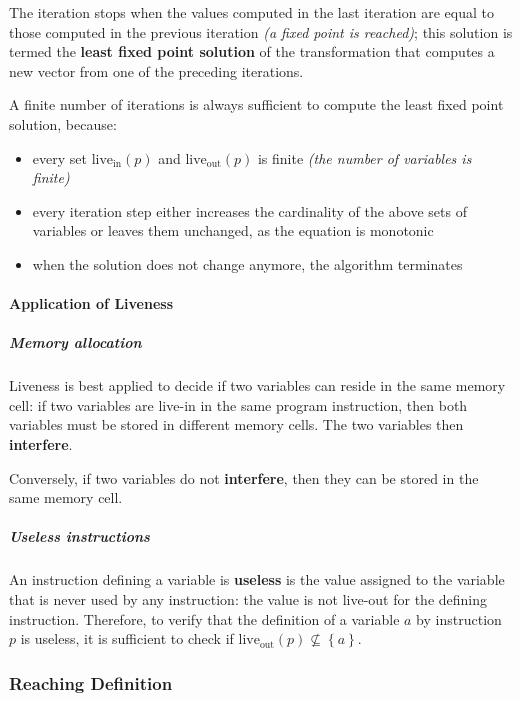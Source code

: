 \documentclass[english]{article}
\begin{document}
The iteration stops when the values computed in the last iteration are equal to those computed in the previous iteration \textit{(a fixed point is reached)};
this solution is termed the \textbf{least fixed point solution} of the transformation that computes a new vector from one of the preceding iterations.

A finite number of iterations is always sufficient to compute the least fixed point solution, because:

\begin{itemize}
  \item every set \(\text{live}_\text{in}\left( p \right)\) and \(\text{live}_\text{out}\left( p \right)\) is finite \textit{(the number of variables is finite)}
  \item every iteration step either increases the cardinality of the above sets of variables or leaves them unchanged, as the equation is monotonic
  \item when the solution does not change anymore, the algorithm terminates
\end{itemize}

\paragraph{Application of Liveness }

\subparagraph*{Memory allocation}

Liveness  is best applied to decide if two variables can reside in the same memory cell:
if two variables are live-in in the same program instruction, then both variables must be stored in different memory cells.
The two variables then \textbf{interfere}.

Conversely, if two variables do not \textbf{interfere}, then they can be stored in the same memory cell.

\subparagraph*{Useless instructions}

An instruction defining a variable is \textbf{useless} is the value assigned to the variable that is never used by any instruction:
the value is not live-out for the defining instruction.
Therefore, to verify that the definition of a variable \(a\) by instruction \(p\) is useless, it is sufficient to check if \(\text{live}_\text{out}\left( p \right) \not\subseteq \left\{ a \right\}\).

\subsubsection{Reaching Definition }
\end{document}
